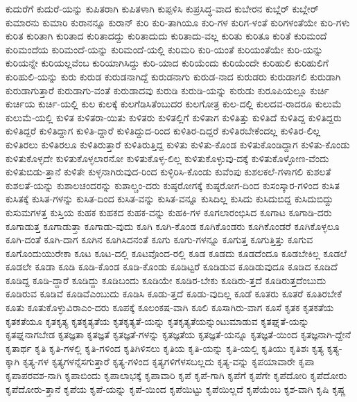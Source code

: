 {ಕುದುರೆಗೆ
ಕುದುರೆ-ಯನ್ನು
ಕುಪಿತರಾಗಿ
ಕುಪಿತಳಾಗಿ
ಕುಪ್ಪಳಿಸಿ
ಕುಪ್ರಸಿದ್ಧ-ವಾದ
ಕುಬೇರನ
ಕುಬ್ಲೆರ್
ಕುಬ್ಲೇರ್
ಕುಮಾರನು
ಕುಮಾರಿ
ಕುರಾನನ್ನೂ
ಕುರಾನ್
ಕುರಿ
ಕುರಿ-ತಾಗಿಯೂ
ಕುರಿ-ಗಳ
ಕುರಿಗ-ಳಂತೆ
ಕುರಿಗಳಂತೆಯೇ
ಕುರಿ-ಗಳು
ಕುರಿತ
ಕುರಿತಾಗಿ
ಕುರಿತಾದ
ಕುರಿತಾದದ್ದು
ಕುರಿತಾದುದು
ಕುರಿತಾದು-ವಲ್ಲ
ಕುರಿತು
ಕುರಿತೂ
ಕುರಿತೆ
ಕುರಿಮಂದೆ
ಕುರಿಮಂದೆಯ
ಕುರಿಮಂದೆ-ಯನ್ನು
ಕುರಿಮಂದೆ-ಯಲ್ಲಿ
ಕುರಿಮರಿ
ಕುರಿ-ಯಂತೆ
ಕುರಿಯಂತೆಯೇ
ಕುರಿ-ಯನ್ನು
ಕುರಿಯನ್ನೇ
ಕುರಿಯಲ್ಲವೆಂಬ
ಕುರಿಯಾಗಿಸಿದ್ದು
ಕುರಿ-ಯಾದ
ಕುರಿಯೆಂದು
ಕುರಿಯೆಂದೇ
ಕುರಿಹುಲಿ
ಕುರಿಹುಲಿಗೆ
ಕುರಿಹುಲಿ-ಯನ್ನು
ಕುರು
ಕುರುಡ
ಕುರುಡನಾಗಿದ್ದೆ
ಕುರುಡನಾಗು
ಕುರುಡ-ನಾದ
ಕುರುಡರು
ಕುರುಡಾಗಲಿ
ಕುರುಡಾಗಿ
ಕುರುಡಾಗುತ್ತಾರೆ
ಕುರುಡಾಗು-ವಂತೆ
ಕುರುಡಾದವು
ಕುರುಡಿ
ಕುರುಡಿ-ಯನ್ನು
ಕುರುಡು
ಕುರೂಪಿಯಲ್ಲೂ
ಕುರ್ಚಿ
ಕುರ್ಚಿಯ
ಕುರ್ಚಿ-ಯಲ್ಲಿ
ಕುಲ
ಕುಲಕ್ಕೆ
ಕುಲಗೆಡಿಸಿತೆಂಬುದರ
ಕುಲಗೋತ್ರ
ಕುಲ-ದಲ್ಲಿ
ಕುಲದವ-ರಾದರೂ
ಕುಲುಮೆ
ಕುಲುಮೆ-ಯಲ್ಲಿ
ಕುಳಿತ
ಕುಳಿತರಾ-ಯಿತು
ಕುಳಿತರು
ಕುಳಿತಲ್ಲಿಗೆ
ಕುಳಿತಾಗ
ಕುಳಿತಿತ್ತು
ಕುಳಿತಿದೆ
ಕುಳಿತಿದ್ದ
ಕುಳಿತಿದ್ದರು
ಕುಳಿತಿದ್ದರೆ
ಕುಳಿತಿದ್ದಾಗ
ಕುಳಿತಿ-ದ್ದಾರೆ
ಕುಳಿತಿದ್ದುದ-ರಿಂದ
ಕುಳಿತಿರ-ದಿದ್ದರೆ
ಕುಳಿತಿರಬೇಕೆಂದಲ್ಲ
ಕುಳಿತಿರ-ಲಿಲ್ಲ
ಕುಳಿತಿರಲು
ಕುಳಿತಿರಲೂ
ಕುಳಿತಿರುತ್ತಾರೆ
ಕುಳಿತಿರುತ್ತಿದ್ದ
ಕುಳಿತು
ಕುಳಿತು-ಕೊಂಡ
ಕುಳಿತುಕೊಂಡಿದ್ದಾಗ
ಕುಳಿತು-ಕೊಂಡು
ಕುಳಿತುಕೊಳ್ಳದೇ
ಕುಳಿತುಕೊಳ್ಳಲಾರನೋ
ಕುಳಿತುಕೊಳ್ಳ-ಲಿಲ್ಲ
ಕುಳಿತುಕೊಳ್ಳುವು-ದಕ್ಕೆ
ಕುಳಿತುಕೊಳ್ಳೋಣ-ವೆಂದು
ಕುಳಿತುಬಿಡು-ತ್ತಾನೆ
ಕುಳಿತೇ
ಕುಳ್ಳನಾಗಿರುವುದ-ರಿಂದ
ಕುಳ್ಳಿರಿಸಿ-ಕೊಂಡು
ಕುವೆಂಪು
ಕುಶಲಕಲೆ-ಗಳಾಗಲಿ
ಕುಶಲತೆ
ಕುಶಲತೆ-ಯನ್ನು
ಕುಶಾಲಚಂದರನ್ನು
ಕುಶಾಲ್ಚಂ-ದರು
ಕುಷ್ಠರೋಗಕ್ಕೆ
ಕುಷ್ಠರೋಗ-ದಿಂದ
ಕುಸಂಸ್ಕಾರ-ಗಳಿಂದ
ಕುಸಿತ
ಕುಸಿತಕ್ಕೆ
ಕುಸಿತ-ಗಳನ್ನು
ಕುಸಿತ-ದಿಂದ
ಕುಸಿತ-ವನ್ನು
ಕುಸಿತ-ವನ್ನೂ
ಕುಸಿದಿಲ್ಲ
ಕುಸಿದು
ಕುಸಿದುಬಿದ್ದ
ಕುಸಿದುಬಿದ್ದು
ಕುಸುಮಗಳತ್ತ
ಕುಸ್ತಿಯ
ಕುಹಕ
ಕುಹಕದ
ಕುಹಕ-ವನ್ನು
ಕುಹಕಿ-ಗಳ
ಕೂಗಲಾರಂಭಿಸಿದ
ಕೂಗಾಟ
ಕೂಗಾಡಿ-ದರು
ಕೂಗಾಡುತ್ತ
ಕೂಗಾಡುತ್ತಾ
ಕೂಗಾಡು-ವುದು
ಕೂಗಿ
ಕೂಗಿ-ಕೊಂಡ
ಕೂಗಿಕೊಂಡರು
ಕೂಗಿಕೊಂಡರೆ
ಕೂಗಿಕೊಳ್ಳಲೂ
ಕೂಗಿ-ದಂತೆ
ಕೂಗಿ-ದಾಗ
ಕೂಗಿನ
ಕೂಗಿಸಿದನಂತೆ
ಕೂಗು
ಕೂಗು-ಗಳನ್ನೂ
ಕೂಗುತ್ತ
ಕೂಗುತ್ತಿತ್ತು
ಕೂಗುವ
ಕೂಗೊಂದುಯುರೇಕಾ
ಕೂಟ
ಕೂಟ-ದಲ್ಲಿ
ಕೂಟವೊಂದ-ರಲ್ಲಿ
ಕೂಡ
ಕೂಡದು
ಕೂಡದೆಂದೂ
ಕೂಡಬೇಕಿಲ್ಲ
ಕೂಡಲೆ
ಕೂಡಲೇ
ಕೂಡಾ
ಕೂಡಿ
ಕೂಡಿ-ಕೊಂಡ
ಕೂಡಿ-ಕೊಂಡು
ಕೂಡಿಟ್ಟರೆ
ಕೂಡಿಡುವ
ಕೂಡಿಡುವುದೂ
ಕೂಡಿದ
ಕೂಡಿದೆ
ಕೂಡಿದ್ದ
ಕೂಡಿ-ದ್ದಾರೆ
ಕೂಡಿದ್ದು
ಕೂಡಿಬಂದು
ಕೂಡಿಯೇ
ಕೂಡಿರ-ಬೇಕು
ಕೂಡಿರು-ತ್ತದೆ
ಕೂಡಿರುತ್ತದೆಂಬುದು
ಕೂಡಿರುವ
ಕೂಡಿವೆ
ಕೂಡಿವೆಎಂಬುದು
ಕೂಡಿಸಿ
ಕೂಡು-ತ್ತದೆ
ಕೂಡು-ವುದಿಲ್ಲ
ಕೂಡೆ
ಕೂತರು
ಕೂತರೆ
ಕೂತಿರಬೇಕೆ
ಕೂತು
ಕೂತುಕೊಳ್ಳುವಿರಾಎಂ-ದರು
ಕೂಪಕ್ಕೆ
ಕೂಲಂಕಷ-ವಾಗಿ
ಕೂಲಿ
ಕೂಸಾಗಿರು-ವಾಗ
ಕೂಸೆ
ಕೃತಕ
ಕೃತಕತೆಯ
ಕೃತಕತೆಯೂ
ಕೃತಕೃತ್ಯ
ಕೃತಕೃತ್ಯತೆಯ
ಕೃತಕೃತ್ಯತೆ-ಯನ್ನು
ಕೃತಕೃತ್ಯತೆಯನ್ನುಂಟುಮಾಡುವ
ಕೃತಘ್ನತೆ-ಯನ್ನು
ಕೃತಘ್ನನಾಗಬೇಡ
ಕೃತಜ್ಞತಾ
ಕೃತಜ್ಞತೆ
ಕೃತಜ್ಞತೆ-ಗಳನ್ನು
ಕೃತಜ್ಞತೆಯ
ಕೃತಜ್ಞತೆ-ಯನ್ನೂ
ಕೃತಜ್ಞತೆ-ಯಿಂದ
ಕೃತಜ್ಞನಾಗಿ-ದ್ದೇನೆ
ಕೃತಾರ್ಥ
ಕೃತಿ
ಕೃತಿ-ಗಳಲ್ಲಿ
ಕೃತಿ-ಗಳಿಂದ
ಕೃತಿಗಿಳಿಸಲು
ಕೃತಿಯ
ಕೃತಿ-ಯನ್ನು
ಕೃತಿ-ಯಲ್ಲಿ
ಕೃತಿಯು
ಕೃತಿಶಃ
ಕೃತ್ಯ
ಕೃತ್ಯ-ಕ್ಕಾಗಿ
ಕೃತ್ಯ-ಗಳ
ಕೃತ್ಯಗಳನ್ನೆಸಗುತ್ತಾರೆ
ಕೃತ್ಯ-ಗಳಿಂದ
ಕೃತ್ಯಗಳಿಗೆಳಸಬಲ್ಲದು
ಕೃತ್ಯ-ವನ್ನು
ಕೃಪಯಾವಾರೇ
ಕೃಪಾ
ಕೃಪಾಪರವಶ-ನಾಗಿ
ಕೃಪಾಬಿಂದು
ಕೃಪಾಲಾಭಕ್ಕೆ
ಕೃಪಾವಾರಿ
ಕೃಪೆ
ಕೃಪೆ-ಗಾಗಿ
ಕೃಪೆಗೆ
ಕೃಪೆಗೇ
ಕೃಪೆದೋರಿ
ಕೃಪೆದೋರು
ಕೃಪೆದೋರು-ತ್ತಾನೆ
ಕೃಪೆಯ
ಕೃಪೆ-ಯನ್ನು
ಕೃಪೆ-ಯಿಂದ
ಕೃಪೆಯಿಟ್ಟು
ಕೃಪೆಯಿಲ್ಲದೆ
ಕೃಪೆಯೆಂಬ
ಕೃಶ-ವಾಗಿ
ಕೃಷಿ
ಕೃಷ್ಣ
}
